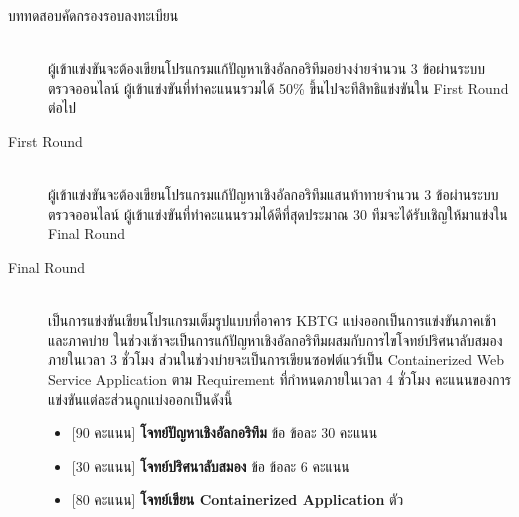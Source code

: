 \begin{description}
\item[\textthai{บททดสอบคัดกรองรอบลงทะเบียน}] \phantom{anchor} \\
    ผู้เข้าแข่งขันจะต้องเขียนโปรแกรมแก้ปัญหาเชิงอัลกอริทึมอย่างง่ายจำนวน 3 ข้อผ่านระบบตรวจออนไลน์\;\;
    ผู้เข้าแข่งขันที่ทำคะแนนรวมได้ 50\% ขึ้นไปจะทีสิทธิแข่งขันใน First Round ต่อไป

\item[First Round] \phantom{anchor} \\
    ผู้เข้าแข่งขันจะต้องเขียนโปรแกรมแก้ปัญหาเชิงอัลกอริทึมแสนท้าทายจำนวน 3 ข้อผ่านระบบตรวจออนไลน์\;\;
    ผู้เข้าแข่งขันที่ทำคะแนนรวมได้ดีที่สุดประมาณ 30 ทีมจะได้รับเชิญให้มาแข่งใน Final Round 

\item[Final Round] \phantom{anchor} \\
    เป็นการแข่งขันเขียนโปรแกรมเต็มรูปแบบที่อาคาร {\ltspc KBTG} แบ่งออกเป็นการแข่งขันภาคเช้าและภาคบ่าย\;\;
    ในช่วงเช้าจะเป็นการแก้ปัญหาเชิงอัลกอริทึมผสมกับการไขโจทย์ปริศนาลับสมอง\:ภายในเวลา 3 ชั่วโมง\;\;
    ส่วนในช่วงบ่ายจะเป็นการเขียนซอฟต์แวร์เป็น Containerized Web Service Application ตาม Requirement ที่กำหนดภายในเวลา 4 ชั่วโมง\;\;
    คะแนนของการแข่งขันแต่ละส่วนถูกแบ่งออกเป็นดังนี้
    \begin{itemize}[topsep=0.5pc]
        \item{} [90 คะแนน]\: \textbf{โจทย์ปัญหาเชิงอัลกอริทึม} ข้อ ข้อละ 30 คะแนน
        \item{} [30 คะแนน]\: \textbf{โจทย์ปริศนาลับสมอง} ข้อ ข้อละ 6 คะแนน
        \item{} [80 คะแนน]\: \textbf{โจทย์เขียน Containerized Application} ตัว
    \end{itemize}
\end{description}
